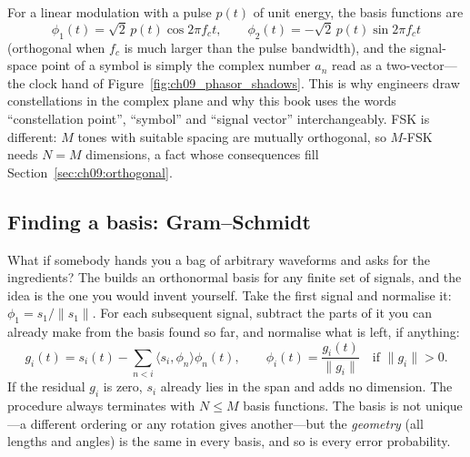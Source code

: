 For a linear modulation with a pulse $p(t)$ of unit energy, the basis functions are
\begin{equation}
\phi_1(t)=\sqrt2\,p(t)\cos 2\pi f_ct,\qquad \phi_2(t)=-\sqrt2\,p(t)\sin 2\pi f_ct
\end{equation}
(orthogonal when $f_c$ is much larger than the pulse bandwidth), and the signal-space point of a
symbol is simply the complex number $a_n$ read as a two-vector---the clock hand of
Figure~\ref{fig:ch09_phasor_shadows}. This is why engineers draw constellations in the complex
plane and why this book uses the words ``constellation point'', ``symbol'' and ``signal vector''
interchangeably. FSK is different: $M$ tones with suitable spacing are mutually orthogonal, so
$M$-FSK needs $N=M$ dimensions, a fact whose consequences fill Section~\ref{sec:ch09:orthogonal}.

\subsection{Finding a basis: Gram--Schmidt}

What if somebody hands you a bag of arbitrary waveforms and asks for the ingredients? The
 builds an orthonormal basis for any finite set of signals, and the
idea is the one you would invent yourself. Take the first signal and normalise it:
$\phi_1=s_1/\|s_1\|$. For each subsequent signal, subtract the parts of it you can already make
from the basis found so far, and normalise what is left, if anything:
\begin{equation}
g_i(t)=s_i(t)-\sum_{n<i}\langle s_i,\phi_n\rangle\phi_n(t),\qquad
\phi_i(t)=\frac{g_i(t)}{\|g_i\|}\quad\text{if }\|g_i\|>0 .
\label{eq:ch09:gs}
\end{equation}
If the residual $g_i$ is zero, $s_i$ already lies in the span and adds no dimension. The procedure
always terminates with $N\le M$ basis functions. The basis is not unique---a different ordering or
any rotation gives another---but the \emph{geometry} (all lengths and angles) is the same in every
basis, and so is every error probability.


